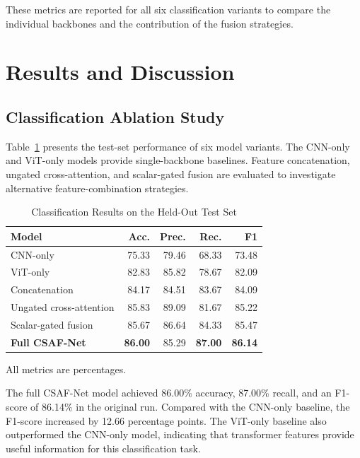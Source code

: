\documentclass[12pt,a4paper,oneside]{article}
\begin{document}
These metrics are reported for all six classification
variants to compare the individual backbones and the
contribution of the fusion strategies.

\section{Results and Discussion}

\subsection{Classification Ablation Study}

Table~\ref{tab:ablation} presents the test-set performance of
six model variants. The CNN-only and ViT-only models provide
single-backbone baselines. Feature concatenation, ungated
cross-attention, and scalar-gated fusion are evaluated to
investigate alternative feature-combination strategies.

\begin{table}[H]
\centering
\caption{Classification Results on the Held-Out Test Set}
\label{tab:ablation}
\small
\setlength{\tabcolsep}{4pt}
\begin{tabular}{lrrrr}
\toprule
\textbf{Model} & \textbf{Acc.} & \textbf{Prec.} &
\textbf{Rec.} & \textbf{F1} \\
\midrule
CNN-only & 75.33 & 79.46 & 68.33 & 73.48 \\
ViT-only & 82.83 & 85.82 & 78.67 & 82.09 \\
Concatenation & 84.17 & 84.51 & 83.67 & 84.09 \\
Ungated cross-attention & 85.83 & 89.09 & 81.67 & 85.22 \\
Scalar-gated fusion & 85.67 & 86.64 & 84.33 & 85.47 \\
\textbf{Full CSAF-Net} & \textbf{86.00} & 85.29 &
\textbf{87.00} & \textbf{86.14} \\
\bottomrule
\end{tabular}

\vspace{1mm}
\parbox{\columnwidth}{\footnotesize
All metrics are percentages.}
\end{table}


The full CSAF-Net model achieved 86.00\% accuracy, 87.00\%
recall, and an F1-score of 86.14\% in the original run.
Compared with the CNN-only baseline, the F1-score increased
by 12.66 percentage points. The ViT-only baseline also
outperformed the CNN-only model, indicating that transformer
features provide useful information for this classification task.
\end{document}
